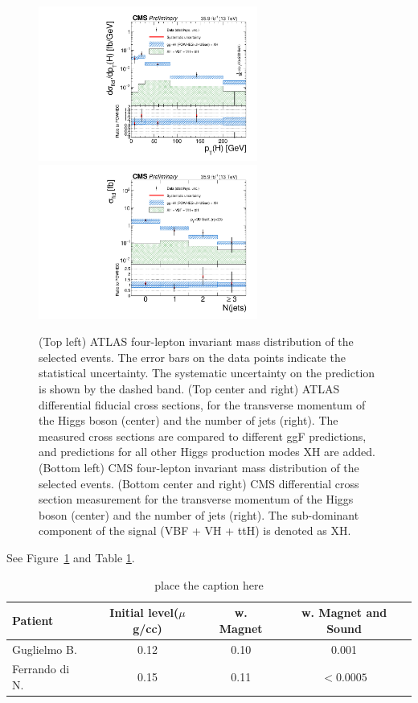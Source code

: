 \documentclass[10pt]{article}
\begin{document}
\begin{figure}[htb]
\includegraphics[height=2in]{figures/CMS-HIG-16-041__Figure_009-b__pT4l.pdf}
\includegraphics[height=2in]{figures/CMS-HIG-16-041__Figure_009-c__njets.pdf}
\caption{
  (Top left) ATLAS four-lepton invariant mass distribution of the selected
  events. The error bars on the data points indicate the statistical uncertainty.
  The systematic uncertainty on the prediction is shown by the dashed band.
  (Top center and right) ATLAS differential fiducial cross sections, for the
  transverse momentum of the Higgs boson (center) and the number of jets (right).
  The measured cross sections are compared to different ggF predictions, and
  predictions for all other Higgs production modes XH are added.
  (Bottom left) CMS four-lepton invariant mass distribution of the selected
  events.
  (Bottom center and right) CMS differential cross section measurement for the
  transverse momentum of the Higgs boson (center) and the number of jets (right).
  The sub-dominant component of the signal (VBF + VH + ttH) is denoted as XH.
}
\label{fig:figure-ZZ}
\end{figure}

See Figure~\ref{fig:figure-ZZ} and Table \ref{tab:table1}. 

\begin{table}[t]
\begin{center}
\begin{tabular}{l|ccc}  
Patient &  Initial level($\mu$g/cc) &  w. Magnet &  
w. Magnet and Sound \\ \hline
 Guglielmo B.  &   0.12     &     0.10      &     0.001  \\
 Ferrando di N. &  0.15     &     0.11      &  $< 0.0005$ \\ \hline
\end{tabular}
\caption{ place the caption here }
\label{tab:table1}
\end{center}
\end{table}
\end{document}
